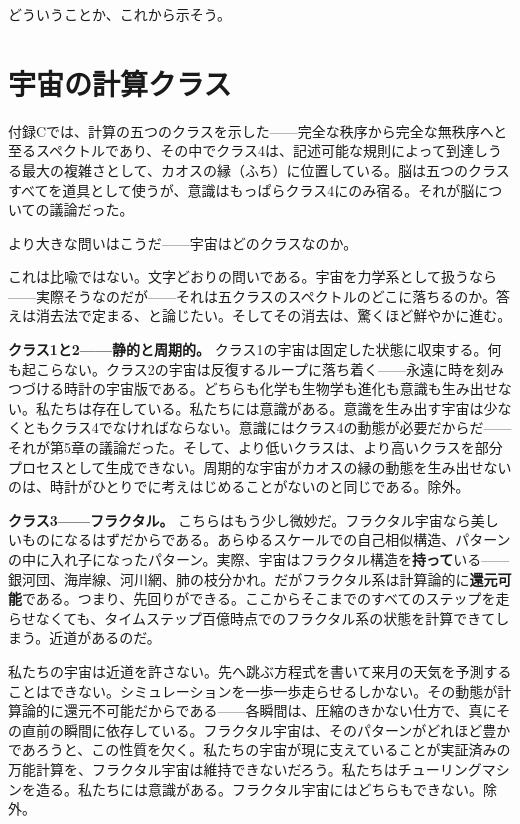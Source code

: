 \documentclass[11pt, twoside, openright]{book}
\begin{document}
どういうことか、これから示そう。


\section*{宇宙の計算クラス}

付録Cでは、計算の五つのクラスを示した------完全な秩序から完全な無秩序へと至るスペクトルであり、その中でクラス4は、記述可能な規則によって到達しうる最大の複雑さとして、カオスの縁（ふち）に位置している。脳は五つのクラスすべてを道具として使うが、意識はもっぱらクラス4にのみ宿る。それが脳についての議論だった。

より大きな問いはこうだ------宇宙はどのクラスなのか。

これは比喩ではない。文字どおりの問いである。宇宙を力学系として扱うなら------実際そうなのだが------それは五クラスのスペクトルのどこに落ちるのか。答えは消去法で定まる、と論じたい。そしてその消去は、驚くほど鮮やかに進む。

\textbf{クラス1と2------静的と周期的。} クラス1の宇宙は固定した状態に収束する。何も起こらない。クラス2の宇宙は反復するループに落ち着く------永遠に時を刻みつづける時計の宇宙版である。どちらも化学も生物学も進化も意識も生み出せない。私たちは存在している。私たちには意識がある。意識を生み出す宇宙は少なくともクラス4でなければならない。意識にはクラス4の動態が必要だからだ------それが第5章の議論だった。そして、より低いクラスは、より高いクラスを部分プロセスとして生成できない。周期的な宇宙がカオスの縁の動態を生み出せないのは、時計がひとりでに考えはじめることがないのと同じである。除外。

\textbf{クラス3------フラクタル。} こちらはもう少し微妙だ。フラクタル宇宙なら美しいものになるはずだからである。あらゆるスケールでの自己相似構造、パターンの中に入れ子になったパターン。実際、宇宙はフラクタル構造を\textbf{持って}いる------銀河団、海岸線、河川網、肺の枝分かれ。だがフラクタル系は計算論的に\textbf{還元可能}である。つまり、先回りができる。ここからそこまでのすべてのステップを走らせなくても、タイムステップ百億時点でのフラクタル系の状態を計算できてしまう。近道があるのだ。

私たちの宇宙は近道を許さない。先へ跳ぶ方程式を書いて来月の天気を予測することはできない。シミュレーションを一歩一歩走らせるしかない。その動態が計算論的に還元不可能だからである------各瞬間は、圧縮のきかない仕方で、真にその直前の瞬間に依存している。フラクタル宇宙は、そのパターンがどれほど豊かであろうと、この性質を欠く。私たちの宇宙が現に支えていることが実証済みの万能計算を、フラクタル宇宙は維持できないだろう。私たちはチューリングマシンを造る。私たちには意識がある。フラクタル宇宙にはどちらもできない。除外。
\end{document}
